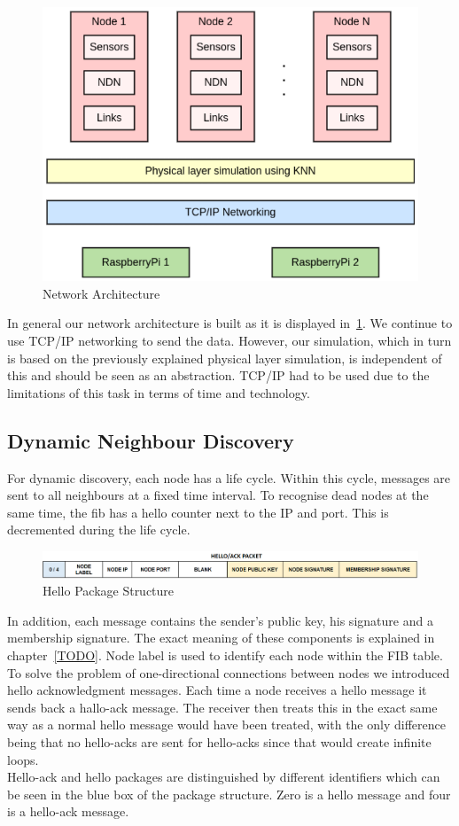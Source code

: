 \documentclass{article}
\begin{document}
	\begin{figure}[H]
		\centering
		\includegraphics[scale=0.4]{media/network_layers.png}
		\caption{Network Architecture}
		\label{fig:network_layers}
	\end{figure}
	In general our network architecture is built as it is displayed in~\ref{fig:network_layers}. We continue to use TCP/IP networking to send the data. However, our simulation, which in turn is based on the previously explained physical layer simulation, is independent of this and should be seen as an abstraction. TCP/IP had to be used due to the limitations of this task in terms of time and technology.
	\subsection{Dynamic Neighbour Discovery}
	For dynamic discovery, each node has a life cycle. Within this cycle, messages are sent to all neighbours at a fixed time interval. To recognise dead nodes at the same time, the fib has a hello counter next to the IP and port. This is decremented during the life cycle.
	\begin{figure}[H]
		\centering
		\includegraphics[scale=0.4]{media/hello_ack_package.png}
		\caption{Hello Package Structure}
		\label{fig:hello_ack_package}
	\end{figure}
	In addition, each message contains the sender's public key, his signature and a membership signature. The exact meaning of these components is explained in chapter~\ref{TODO}. Node label is used to identify each node within the FIB table.\\
	To solve the problem of one-directional connections between nodes we introduced hello acknowledgment messages. Each time a node receives a hello message it sends back a hallo-ack message. The receiver then treats this in the exact same way as a normal hello message would have been treated, with the only difference being that no hello-acks are sent for hello-acks since that would create infinite loops.\\
	Hello-ack and hello packages are distinguished by different identifiers which can be seen in the blue box of the package structure. Zero is a hello message and four is a hello-ack message.
\end{document}
